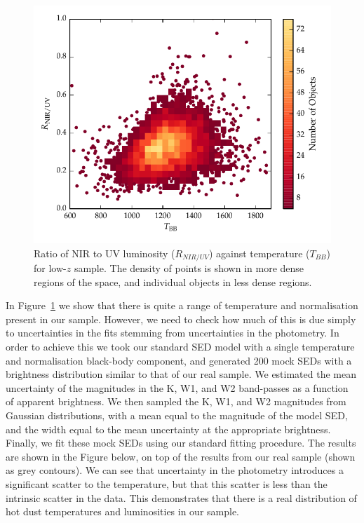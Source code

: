 \begin{figure}
  \centering
  \includegraphics[width=\textwidth]{figures/chapter06/ratio_tbb_density.pdf}
  \caption{Ratio of NIR to UV luminosity ($R_{NIR/UV}$) against temperature ($T_{BB}$) for low-$z$ sample. The density of points is shown in more dense regions of the space, and individual objects in less dense regions. }
  \label{fig:ratio_tbb_density}
\end{figure}

In Figure~\ref{fig:ratio_tbb_density} we show that there is quite a range of temperature and normalisation present in our sample. 
However, we need to check how much of this is due simply to uncertainties in the fits stemming from uncertainties in the photometry. 
In order to achieve this we took our standard SED model with a single temperature and normalisation black-body component, and generated 200 mock SEDs with a brightness distribution similar to that of our real sample. 
We estimated the mean uncertainty of the magnitudes in the K, W1, and W2 band-passes as a function of apparent brightness. 
We then sampled the K, W1, and W2 magnitudes from Gaussian distributions, with a mean equal to the magnitude of the model SED, and the width equal to the mean uncertainty at the appropriate brightness. 
Finally, we fit these mock SEDs using our standard fitting procedure. 
The results are shown in the Figure below, on top of the results from our real sample (shown as grey contours). 
We can see that uncertainty in the photometry introduces a significant scatter to the temperature, but that this scatter is less than the intrinsic scatter in the data. 
This demonstrates that there is a real distribution of hot dust temperatures and luminosities in our sample. 

